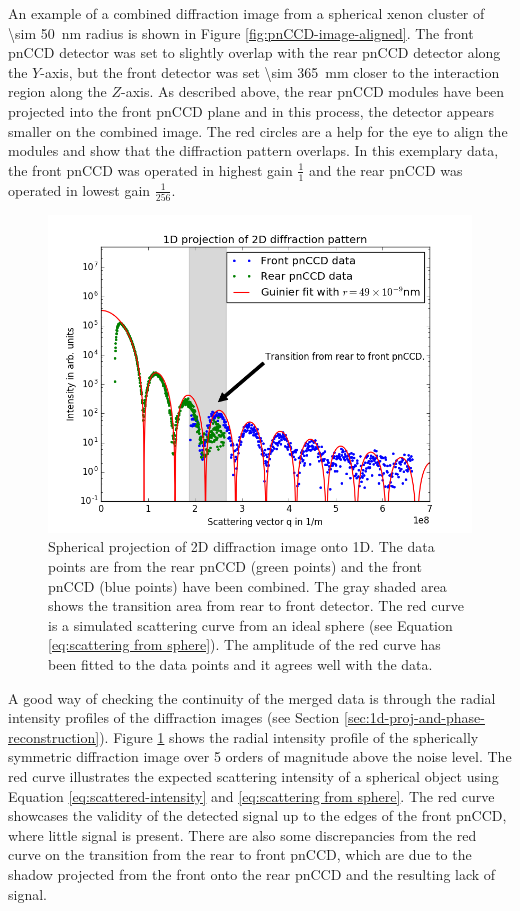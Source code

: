 %
An example of a combined diffraction image from a spherical xenon cluster of \SI{\sim 50}{\nano\meter} radius is shown in Figure \ref{fig:pnCCD-image-aligned}. The front pnCCD detector was set to slightly overlap with the rear pnCCD detector along the $Y$-axis, but the front detector was set \SI{\sim 365}{\milli\meter} closer to the interaction region along the $Z$-axis. As described above, the rear pnCCD modules have been projected into the front pnCCD plane and in this process, the detector appears smaller on the combined image. The red circles are a help for the eye to align the modules and show that the diffraction pattern overlaps. In this exemplary data, the front pnCCD was operated in highest gain $\frac{1}{1}$ and the rear pnCCD was operated in lowest gain $\frac{1}{256}$.\\[1\baselineskip]
\begin{figure}
	\centering
		\includegraphics[height=0.45\textwidth]{images/pnCCD-1d-sum.png}
	\caption[Spherical projection of 2D diffraction image onto 1D.]{Spherical projection of 2D diffraction image onto 1D. The data points are from the rear pnCCD (green points) and the front pnCCD (blue points) have been combined. The gray shaded area shows the transition area from rear to front detector. The red curve is a simulated scattering curve from an ideal sphere (see Equation \eqref{eq:scattering from sphere}). The amplitude of the red curve has been fitted to the data points and it agrees well with the data.}
	\label{fig:pnCCD-1d-sum}
\end{figure}
A good way of checking the continuity of the merged data is through the radial intensity profiles of the diffraction images (see Section \ref{sec:1d-proj-and-phase-reconstruction}). Figure \ref{fig:pnCCD-1d-sum} shows the radial intensity profile of the spherically symmetric diffraction image over 5 orders of magnitude above the noise level. The red curve illustrates the expected scattering intensity of a spherical object using Equation \eqref{eq:scattered-intensity} and \eqref{eq:scattering from sphere}. The red curve showcases the validity of the detected signal up to the edges of the front pnCCD, where little signal is present. There are also some discrepancies from the red curve on the transition from the rear to front pnCCD, which are due to the shadow projected from the front onto the rear pnCCD and the resulting lack of signal. 
%
%
%
